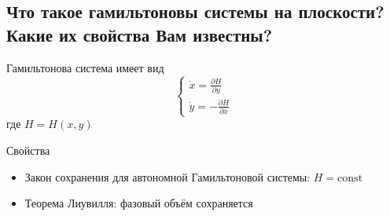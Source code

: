 \documentclass{article}
\begin{document}
\subsection{Что такое гамильтоновы системы на плоскости? Какие их свойства Вам известны?}
Гамильтонова система имеет вид 
\[ \left\{\begin{matrix}
	\dot{x}=\frac{\partial H}{\partial y}\\ 
	\dot{y}=-\frac{\partial H}{\partial x}
\end{matrix}\right. \]
где $ H=H(x,y) $

Свойства
\begin{itemize}
	\item Закон сохранения для автономной Гамильтоновой системы: $ H=\text{const} $
	\item Теорема Лиувилля: фазовый объём сохраняется %
\end{itemize}
\end{document}
